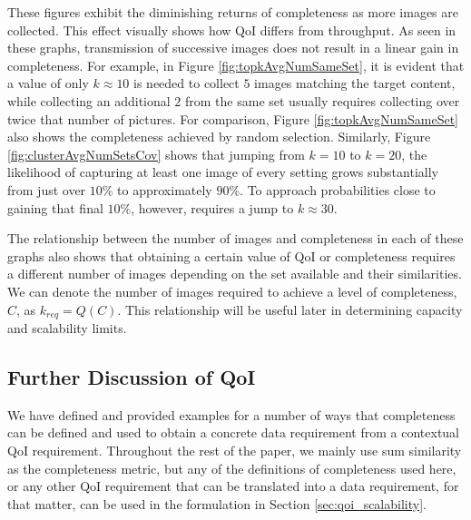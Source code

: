 These figures exhibit the diminishing returns of completeness as more images are collected.  This effect visually shows how QoI differs from throughput.  As seen in these graphs, transmission of successive images does not result in a linear gain in completeness.  For example, in Figure \ref{fig:topkAvgNumSameSet}, it is evident that a value of only $k \approx 10$ is needed to collect $5$ images matching the target content, while collecting an additional $2$ from the same set usually requires collecting over twice that number of pictures.  For comparison, Figure \ref{fig:topkAvgNumSameSet} also shows the completeness achieved by random selection.
Similarly, Figure \ref{fig:clusterAvgNumSetsCov} shows that jumping from $k=10$ to $k=20$, the likelihood of capturing at least one image of every setting grows substantially from just over $10\%$ to approximately $90\%$.  To approach probabilities close to gaining that final $10\%$, however, requires a jump to $k\approx30$.  

The relationship between the number of images and completeness in each of these graphs also shows that obtaining a certain value of QoI or completeness requires a different number of images depending on the set available and their similarities.  We can denote the number of images required to achieve a level of completeness, $C$, as $k_{req} = Q(C)$.  This relationship will be useful later in determining capacity and scalability limits.

\subsection{Further Discussion of QoI}
We have defined and provided examples for a number of ways that completeness can be defined and used to obtain a concrete data requirement from a contextual QoI requirement.  Throughout the rest of the paper, we mainly use sum similarity as the completeness metric, but any of the definitions of completeness used here, or any other QoI requirement that can be translated into a data requirement, for that matter, can be used in the formulation in Section \ref{sec:qoi_scalability}.

